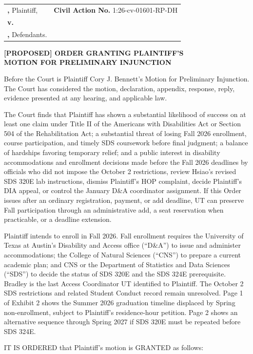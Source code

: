 \documentclass[12pt]{article}
\makeatletter
\renewcommand{\FilingCivilActionNumber}{1:26-cv-01601-RP-DH}
\newcommand{\Caption}{%
  \begin{singlespace}
  \begin{center}
  \textbf{\FilingCourtName}\\
  \textbf{\FilingDistrictName}\\
  \textbf{\FilingDivisionName}
  \end{center}

  \vspace{0.45em}

  \noindent
  \begin{tabularx}{\textwidth}{@{}>{\raggedright\arraybackslash}X>{\raggedright\arraybackslash}p{2.95in}@{}}
  \textbf{\FilingPlaintiffNameUpper,} Plaintiff, & \textbf{Civil Action No.} \FilingCivilActionNumber \\
  \textbf{v.} & \\
  \textbf{\FilingDefendantsInlineUpper,} Defendants. & \\
  \end{tabularx}

  \vspace{1.0em}
  \end{singlespace}%
}
\makeatother
\begin{document}
\Caption

\begin{singlespace}
\begin{center}
\textbf{[PROPOSED] ORDER GRANTING PLAINTIFF'S}\\
\textbf{MOTION FOR PRELIMINARY INJUNCTION}
\end{center}
\end{singlespace}

Before the Court is Plaintiff Cory J. Bennett's Motion for Preliminary Injunction. The Court has considered the motion, declaration, appendix, response, reply, evidence presented at any hearing, and applicable law.

The Court finds that Plaintiff has shown a substantial likelihood of success on at least one claim under Title II of the Americans with Disabilities Act or Section 504 of the Rehabilitation Act; a substantial threat of losing Fall 2026 enrollment, course participation, and timely SDS coursework before final judgment; a balance of hardships favoring temporary relief; and a public interest in disability accommodations and enrollment decisions made before the Fall 2026 deadlines by officials who did not impose the October 2 restrictions, review Hsiao's revised SDS 320E lab instructions, dismiss Plaintiff's HOP complaint, decide Plaintiff's DIA appeal, or control the January D\&A coordinator assignment. If this Order issues after an ordinary registration, payment, or add deadline, UT can preserve Fall participation through an administrative add, a seat reservation when practicable, or a deadline extension.

Plaintiff intends to enroll in Fall 2026. Fall enrollment requires the University of Texas at Austin's Disability and Access office (``D\&A'') to issue and administer accommodations; the College of Natural Sciences (``CNS'') to prepare a current academic plan; and CNS or the Department of Statistics and Data Sciences (``SDS'') to decide the status of SDS 320E and the SDS 324E prerequisite. Bradley is the last Access Coordinator UT identified to Plaintiff. The October 2 SDS restrictions and related Student Conduct record remain unresolved. Page 1 of Exhibit 2 shows the Summer 2026 graduation timeline displaced by Spring non-enrollment, subject to Plaintiff's residence-hour petition. Page 2 shows an alternative sequence through Spring 2027 if SDS 320E must be repeated before SDS 324E.

IT IS ORDERED that Plaintiff's motion is GRANTED as follows:
\end{document}
